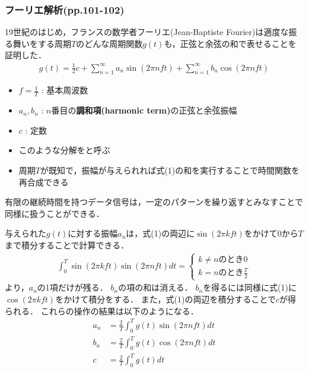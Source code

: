 \documentclass[a4paper]{ltjsarticle}
\begin{document}
		\subsubsection{フーリエ解析(pp.101-102)}
			19世紀のはじめ，フランスの数学者フーリエ(Jean-Baptiste Fourier)は適度な振る舞いをする周期$T$のどんな周期関数$g(t)$も，正弦と余弦の和で表せることを証明した．
			\begin{align}
				g(t) = \frac{1}{2}c + \sum^{\infty}_{n=1} a_n \sin(2\pi nft) + \sum^{\infty}_{n=1} b_n \cos(2\pi nft)
			\end{align}
			\begin{itemize}
				\item $f=\frac{1}{T}$ : 基本周波数
				\item $a_n,b_n$ : $n$番目の{\gtfamily\textbf{調和項(harmonic term)}}の正弦と余弦振幅
				\item $c$ : 定数
				\item このような分解をと呼ぶ
				\item 周期$T$が既知で，振幅が与えられれば式(1)の和を実行することで時間関数を再合成できる
			\end{itemize}
			有限の継続時間を持つデータ信号は，一定のパターンを繰り返すとみなすことで同様に扱うことができる．\par
			与えられた$g(t)$に対する振幅$a_n$は，式(1)の両辺に$\sin(2\pi kft)$をかけて$0$から$T$まで積分することで計算できる．
			\begin{align}
				\int^T_0 \sin(2\pi kft) \sin(2\pi nft) dt =
				\begin{cases}
					k \neq n \text{のとき} 0 \\
					k = n \text{のとき} \frac{T}{2}
				\end{cases}
			\end{align}
			より，$a_n$の1項だけが残る．
			$b_n$の項の和は消える．
			$b_n$を得るには同様に式(1)に$\cos(2\pi kft)$をかけて積分をする．
			また，式(1)の両辺を積分することで$c$が得られる．
			これらの操作の結果は以下のようになる．
			\begin{align}
				a_n &= \frac{2}{T} \int^T_0 g(t) \sin(2\pi nft)dt \\
				b_n &= \frac{2}{T} \int^T_0 g(t) \cos(2\pi nft)dt \\
				c &= \frac{2}{T} \int^T_0 g(t) dt
			\end{align}
\end{document}
